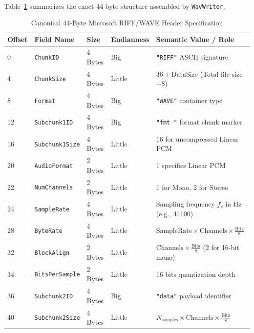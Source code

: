 \documentclass[12pt,a4paper,oneside]{book}
\begin{document}
Table~\ref{tab:riff_header} summarizes the exact 44-byte structure assembled by \texttt{WavWriter}.

\begin{table}[htbp]
\centering
\caption{Canonical 44-Byte Microsoft RIFF/WAVE Header Specification}
\label{tab:riff_header}
\footnotesize
\begin{tabular}{@{}llllp{6.8cm}@{}}
\toprule
\textbf{Offset} & \textbf{Field Name} & \textbf{Size} & \textbf{Endianness} & \textbf{Semantic Value / Role} \\ \midrule
0 & \texttt{ChunkID} & 4 Bytes & Big & \texttt{"RIFF"} ASCII signature \\
4 & \texttt{ChunkSize} & 4 Bytes & Little & $36 + \text{DataSize}$ (Total file size $- 8$) \\
8 & \texttt{Format} & 4 Bytes & Big & \texttt{"WAVE"} container type \\
12 & \texttt{Subchunk1ID} & 4 Bytes & Big & \texttt{"fmt "} format chunk marker \\
16 & \texttt{Subchunk1Size} & 4 Bytes & Little & 16 for uncompressed Linear PCM \\
20 & \texttt{AudioFormat} & 2 Bytes & Little & 1 specifies Linear PCM \\
22 & \texttt{NumChannels} & 2 Bytes & Little & 1 for Mono, 2 for Stereo \\
24 & \texttt{SampleRate} & 4 Bytes & Little & Sampling frequency $f_s$ in Hz (e.g., 44100) \\
28 & \texttt{ByteRate} & 4 Bytes & Little & $\text{SampleRate} \times \text{Channels} \times \frac{\text{Bits}}{8}$ \\
32 & \texttt{BlockAlign} & 2 Bytes & Little & $\text{Channels} \times \frac{\text{Bits}}{8}$ (2 for 16-bit mono) \\
34 & \texttt{BitsPerSample} & 2 Bytes & Little & 16 bits quantization depth \\
36 & \texttt{Subchunk2ID} & 4 Bytes & Big & \texttt{"data"} payload identifier \\
40 & \texttt{Subchunk2Size} & 4 Bytes & Little & $N_{\text{samples}} \times \text{Channels} \times \frac{\text{Bits}}{8}$ \\
\bottomrule
\end{tabular}
\end{table}

\FloatBarrier

\end{document}
